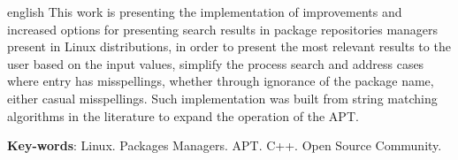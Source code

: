 \begin{resumo}[Abstract]
 \begin{otherlanguage*}{english}
   This work is presenting the implementation of improvements and increased options for presenting search results in package repositories managers present in Linux distributions, in order to present the most relevant results to the user based on the input values, simplify the process search and address cases where entry has misspellings, whether through ignorance of the package name, either casual misspellings. Such implementation was built from string matching algorithms in the literature to expand the operation of the APT.

   \vspace{\onelineskip}
 
   \noindent 
   \textbf{Key-words}: Linux. Packages Managers. APT. C++. Open Source Community.
 \end{otherlanguage*}
\end{resumo}
